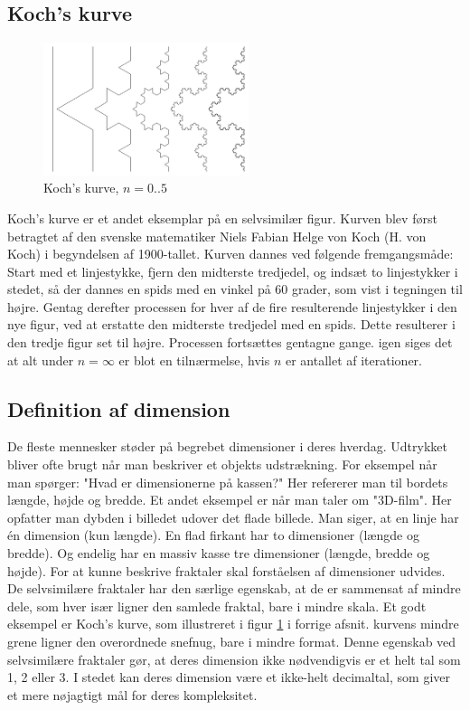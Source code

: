 \documentclass{article}
\begin{document}
\subsection{Koch’s kurve}
\begin{figure}
\includegraphics[width=6cm]{kochkurve}
\caption{Koch’s kurve, $n=0..5$}\label{wrap-fig:3}
\end{figure} 
Koch’s kurve er et andet eksemplar på en selvsimilær figur. Kurven blev først betragtet af den svenske matematiker Niels Fabian Helge von Koch (H. von Koch) i begyndelsen af 1900-tallet. Kurven dannes ved følgende fremgangsmåde: Start med et linjestykke, fjern den midterste tredjedel, og indsæt to linjestykker i stedet, så der dannes en spids med en vinkel på 60 grader, som vist i tegningen til højre. Gentag derefter processen for hver af de fire resulterende linjestykker i den nye figur, ved at erstatte den midterste tredjedel med en spids. Dette resulterer i den tredje figur set til højre. Processen fortsættes gentagne gange. igen siges det at alt under $n=\infty$ er blot en tilnærmelse, hvis $n$ er antallet af iterationer.
\newpage
\subsection{Definition af dimension}
De fleste mennesker støder på begrebet dimensioner i deres hverdag. Udtrykket bliver ofte brugt når man beskriver et objekts udstrækning. For eksempel når man spørger: "Hvad er dimensionerne på kassen?" Her refererer man til bordets længde, højde og bredde. Et andet eksempel er når man taler om "3D-film". Her opfatter man dybden i billedet udover det flade billede. Man siger, at en linje har én dimension (kun længde). En flad firkant har to dimensioner (længde og bredde). Og endelig har en massiv kasse tre dimensioner (længde, bredde og højde). For at kunne beskrive fraktaler skal forståelsen af dimensioner udvides. De selvsimilære fraktaler har den særlige egenskab, at de er sammensat af mindre dele, som hver især ligner den samlede fraktal, bare i mindre skala. Et godt eksempel er Koch's kurve, som illustreret i figur \ref{wrap-fig:3} i forrige afsnit. kurvens mindre grene ligner den overordnede snefnug, bare i mindre format. Denne egenskab ved selvsimilære fraktaler gør, at deres dimension ikke nødvendigvis er et helt tal som 1, 2 eller 3. I stedet kan deres dimension være et ikke-helt decimaltal, som giver et mere nøjagtigt mål for deres kompleksitet.
\end{document}
